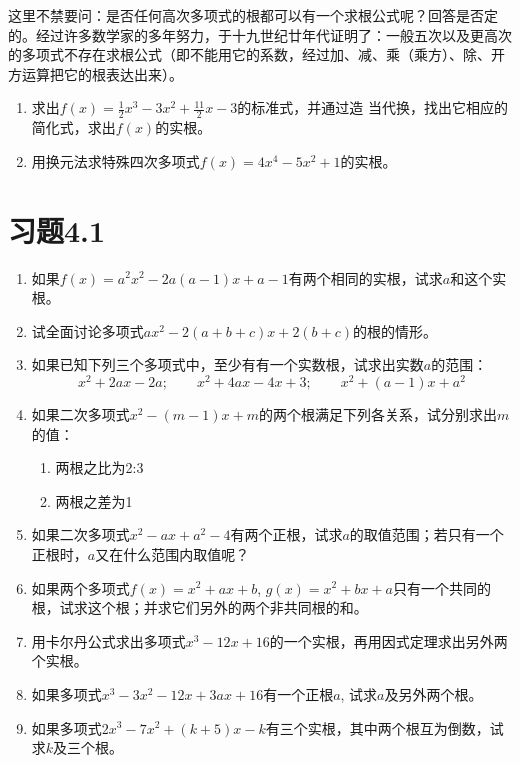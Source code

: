 这里不禁要问：是否任何高次多项式的根都可以有一个求根公式呢？回答是否定的。经过许多数学家的多年努力，于十九世纪廿年代证明了：一般五次以及更高次的多项式不存在求根公式（即不能用它的系数，经过加、减、乘（乘方）、除、开方运算把它的根表达出来）。

\begin{ex}
\begin{enumerate}
    \item 求出$f(x)=\frac{1}{2}x^3-3x^2+\frac{11}{2}x-3$的标准式，并通过造
当代换，找出它相应的简化式，求出$f(x)$的实根。
\item 用换元法求特殊四次多项式$f(x)=4x^4-5x^2+1$的实根。
\end{enumerate}
\end{ex}

\section*{习题4.1}
\begin{enumerate}
    \item 如果$f(x)=a^2x^2-2a(a-1)x+a-1$有两个相同的实根，试求$a$和这个实根。
    \item 试全面讨论多项式$ax^2-2(a+b+c)x+2(b+c)$的根的情形。
    \item 如果已知下列三个多项式中，至少有有一个实数根，试求出实数$a$的范围：
\[x^2+2ax-2a;\qquad x^2+4ax-4x+3;\qquad x^2+(a-1)x+a^2\]
\item 如果二次多项式$x^2-(m-1)x+m$的两个根满足下列各关系，试分别求出$m$的值：
\begin{multicols}{2}
    \begin{enumerate}
        \item 两根之比为2:3
        \item 两根之差为1
    \end{enumerate}
\end{multicols}

\item 如果二次多项式$x^2-ax+a^2-4$有两个正根，试求$a$的取值范围；若只有一个正根时，$a$又在什么范围内取值呢？
\item 如果两个多项式$f(x)=x^2+ax+b$, $g(x)=x^2+bx+a$只有一个共同的根，试求这个根；并求它们另外的两个非共同根的和。
\item 用卡尔丹公式求出多项式$x^3-12x+16$的一个实根，再用因式定理求出另外两个实根。
\item 如果多项式$x^3-3x^2-12x+3ax+16$有一个正根$a$, 试求$a$及另外两个根。
\item 如果多项式$2x^3-7x^2+(k+5)x-k$有三个实根，其中两个根互为倒数，试求$k$及三个根。
\end{enumerate}

